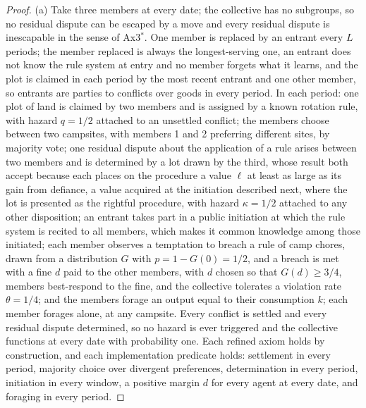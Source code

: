 \documentclass[11pt,letterpaper]{article}
\theoremstyle{definition}
\theoremstyle{remark}
\begin{document}
\begin{proof}
(a) Take three members at every date; the collective has no subgroups, so no residual dispute can be escaped by a move and every residual dispute is inescapable in the sense of Ax3$^{*}$. One member is replaced by an entrant every $L$ periods; the member replaced is always the longest-serving one, an entrant does not know the rule system at entry and no member forgets what it learns, and the plot is claimed in each period by the most recent entrant and one other member, so entrants are parties to conflicts over goods in every period. In each period: one plot of land is claimed by two members and is assigned by a known rotation rule, with hazard $q=1/2$ attached to an unsettled conflict; the members choose between two campsites, with members 1 and 2 preferring different sites, by majority vote; one residual dispute about the application of a rule arises between two members and is determined by a lot drawn by the third, whose result both accept because each places on the procedure a value $\ell$ at least as large as its gain from defiance, a value acquired at the initiation described next, where the lot is presented as the rightful procedure, with hazard $\kappa=1/2$ attached to any other disposition; an entrant takes part in a public initiation at which the rule system is recited to all members, which makes it common knowledge among those initiated; each member observes a temptation to breach a rule of camp chores, drawn from a distribution $G$ with $p=1-G(0)=1/2$, and a breach is met with a fine $d$ paid to the other members, with $d$ chosen so that $G(d)\ge3/4$, members best-respond to the fine, and the collective tolerates a violation rate $\theta=1/4$; and the members forage an output equal to their consumption $k$; each member forages alone, at any campsite. Every conflict is settled and every residual dispute determined, so no hazard is ever triggered and the collective functions at every date with probability one. Each refined axiom holds by construction, and each implementation predicate holds: settlement in every period, majority choice over divergent preferences, determination in every period, initiation in every window, a positive margin $d$ for every agent at every date, and foraging in every period.


\end{proof}
\end{document}
